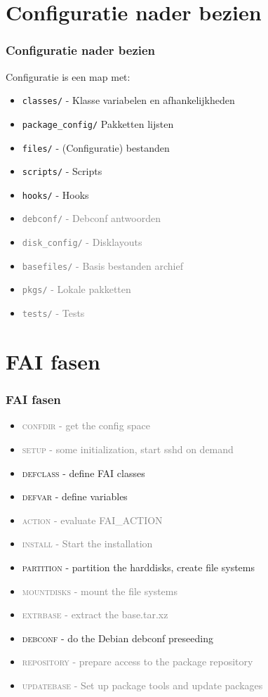 \documentclass{beamer}
\newcommand{\light}[1]{\textcolor{gray}{#1}}
\begin{document}
\section{Configuratie nader bezien}
\begin{frame}
\frametitle{Configuratie nader bezien}
Configuratie is een map met:
\begin{itemize}
  \item \texttt{classes/} - Klasse variabelen en afhankelijkheden
  \item<2-> \texttt{package\_config/}  Pakketten lijsten
  \item<3-> \texttt{files/} - (Configuratie) bestanden
  \item<4-> \texttt{scripts/} - Scripts
  \item<5-> \texttt{hooks/} - Hooks
  \item<6-> \light{\texttt{debconf/} - Debconf antwoorden}
  \item<6-> \light{\texttt{disk\_config/} - Disklayouts}
  \item<6-> \light{\texttt{basefiles/} - Basis bestanden archief}
  \item<6-> \light{\texttt{pkgs/} - Lokale pakketten}
  \item<6-> \light{\texttt{tests/} - Tests}
\end{itemize}
\end{frame}

\section{FAI fasen}
\begin{frame}
\frametitle{FAI fasen}
\begin{itemize}
  \item<2-> \light{\textsc{confdir} - get the config space}
  \item<2-> \light{\textsc{setup}                 - some initialization, start sshd on demand}
  \item<2-> \textsc{defclass}              - define FAI classes
  \item<2-> \textsc{defvar}                - define variables
  \item<3-> \light{\textsc{action}                - evaluate FAI\_ACTION}
  \item<3-> \light{\textsc{install}               - Start the installation}
  \item<3-> \textsc{partition}             - partition the harddisks, create file systems
  \item<4-> \light{\textsc{mountdisks}            - mount the file systems}
  \item<4-> \light{\textsc{extrbase}              - extract the base.tar.xz}
  \item<4-> \textsc{debconf}               - do the Debian debconf preseeding
  \item<5-> \light{\textsc{repository}            - prepare access to the package repository}
  \item<5-> \light{\textsc{updatebase}            - Set up package tools and update packages}
\end{itemize}
\end{frame}
\end{document}
